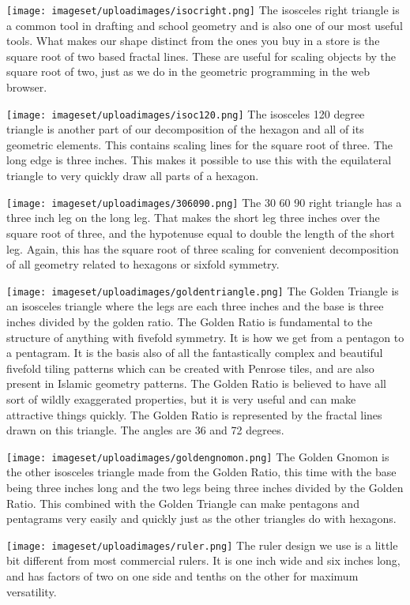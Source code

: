 \texttt{[image: imageset/uploadimages/isocright.png]} The isosceles
right triangle is a common tool in drafting and school geometry and is
also one of our most useful tools. What makes our shape distinct from
the ones you buy in a store is the square root of two based fractal
lines. These are useful for scaling objects by the square root of two,
just as we do in the geometric programming in the web browser.

\texttt{[image: imageset/uploadimages/isoc120.png]} The isosceles 120
degree triangle is another part of our decomposition of the hexagon and
all of its geometric elements. This contains scaling lines for the
square root of three. The long edge is three inches. This makes it
possible to use this with the equilateral triangle to very quickly draw
all parts of a hexagon.

\texttt{[image: imageset/uploadimages/306090.png]} The 30 60 90 right
triangle has a three inch leg on the long leg. That makes the short leg
three inches over the square root of three, and the hypotenuse equal to
double the length of the short leg. Again, this has the square root of
three scaling for convenient decomposition of all geometry related to
hexagons or sixfold symmetry.

\texttt{[image: imageset/uploadimages/goldentriangle.png]} The Golden
Triangle is an isosceles triangle where the legs are each three inches
and the base is three inches divided by the golden ratio. The Golden
Ratio is fundamental to the structure of anything with fivefold
symmetry. It is how we get from a pentagon to a pentagram. It is the
basis also of all the fantastically complex and beautiful fivefold
tiling patterns which can be created with Penrose tiles, and are also
present in Islamic geometry patterns. The Golden Ratio is believed to
have all sort of wildly exaggerated properties, but it is very useful
and can make attractive things quickly. The Golden Ratio is represented
by the fractal lines drawn on this triangle. The angles are 36 and 72
degrees.

\texttt{[image: imageset/uploadimages/goldengnomon.png]} The Golden
Gnomon is the other isosceles triangle made from the Golden Ratio, this
time with the base being three inches long and the two legs being three
inches divided by the Golden Ratio. This combined with the Golden
Triangle can make pentagons and pentagrams very easily and quickly just
as the other triangles do with hexagons.

\texttt{[image: imageset/uploadimages/ruler.png]} The ruler design we
use is a little bit different from most commercial rulers. It is one
inch wide and six inches long, and has factors of two on one side and
tenths on the other for maximum versatility.

